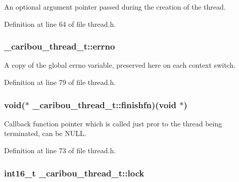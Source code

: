 An optional argument pointer passed during the creation of the thread. 



Definition at line 64 of file thread.\-h.

\hypertarget{struct__caribou__thread__t_a4a14ec3ec88fb5528f43e53686271828}{
\subsubsection[{errno}]{ \-\_\-caribou\-\_\-thread\-\_\-t\-::errno}}\label{struct__caribou__thread__t_a4a14ec3ec88fb5528f43e53686271828}


A copy of the global errno variable, preserved here on each context switch. 



Definition at line 79 of file thread.\-h.

\hypertarget{struct__caribou__thread__t_abf99478d61f893fa11b938c562a9ef20}{
\subsubsection[{finishfn}]{\setlength{\rightskip}{0pt plus 5cm}void($\ast$ \-\_\-caribou\-\_\-thread\-\_\-t\-::finishfn)(void $\ast$)}}\label{struct__caribou__thread__t_abf99478d61f893fa11b938c562a9ef20}


Callback function pointer which is called just pror to the thread being terminated, can be N\-U\-L\-L. 



Definition at line 73 of file thread.\-h.

\hypertarget{struct__caribou__thread__t_a3f291721c2674ea6c5776d014357144b}{
\subsubsection[{lock}]{\setlength{\rightskip}{0pt plus 5cm}int16\-\_\-t \-\_\-caribou\-\_\-thread\-\_\-t\-::lock}}\label{struct__caribou__thread__t_a3f291721c2674ea6c5776d014357144b}


